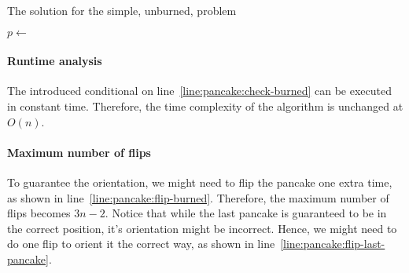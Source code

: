 \begin{algorithm}
	\caption{The solution for the simple, unburned, problem}
	\begin{algorithmic}[1]
			  \label{}
				\State {} \label{line:pancake:flip-last-pancake}
			\EndIf
			\State \Return
		\EndIf
	  	\State $p \gets$   \label{line:pancake:find}
		\State {}  \label{line:pancake:flip-large}
		 \label{line:pancake:check-burned}  \label{}
			\State {}  \label{line:pancake:flip-burned}
		\EndIf
		\State {}  \label{line:pancake:flip-all}
		\State {}
	  \EndFunction
	\end{algorithmic}
	\label{algo:pancakes-burned}
\end{algorithm}

\paragraph{Runtime analysis}
The introduced conditional on line~\ref{line:pancake:check-burned} can be executed in constant time.
Therefore, the time complexity of the algorithm is unchanged at $O(n)$.

\paragraph{Maximum number of flips}
To guarantee the orientation, we might need to flip the pancake one extra time, as shown in line~\ref{line:pancake:flip-burned}.
Therefore, the maximum number of flips becomes $3n-2$.
Notice that while the last pancake is guaranteed to be in the correct position, it's orientation might be incorrect.
Hence, we might need to do one flip to orient it the correct way, as shown in line~\ref{line:pancake:flip-last-pancake}.